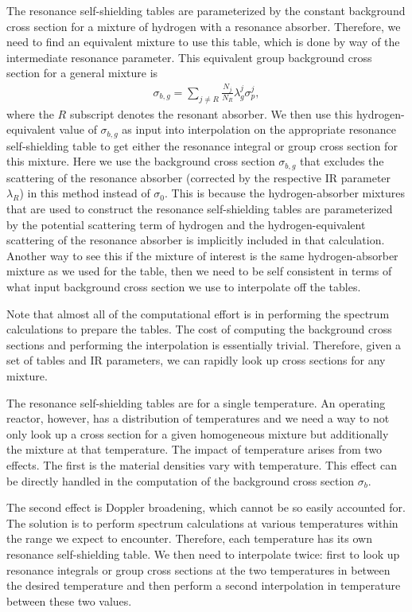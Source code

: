 The resonance self-shielding tables are parameterized by the constant background cross section for a mixture of hydrogen with a resonance absorber. Therefore, we need to find an equivalent mixture to use this table, which is done by way of the intermediate resonance parameter. This equivalent group background cross section for a general mixture is
\begin{align}
  \sigma_{b,g} = \sum_{j \ne R} \frac{N_j}{N_R} \lambda_g^j \sigma_p^j ,
\end{align}
where the $R$ subscript denotes the resonant absorber. We then use this hydrogen-equivalent value of $\sigma_{b,g}$ as input into interpolation on the appropriate resonance self-shielding table to get either the resonance integral or group cross section for this mixture. Here we use the background cross section $\sigma_{b,g}$ that excludes the scattering of the resonance absorber (corrected by the respective IR parameter $\lambda_R$) in this method instead of $\sigma_0$. This is because the hydrogen-absorber mixtures that are used to construct the resonance self-shielding tables are parameterized by the potential scattering term of hydrogen and the hydrogen-equivalent scattering of the resonance absorber is implicitly included in that calculation. Another way to see this if the mixture of interest is the same hydrogen-absorber mixture as we used for the table, then we need to be self consistent in terms of what input background cross section we use to interpolate off the tables.

Note that almost all of the computational effort is in performing the spectrum calculations to prepare the tables. The cost of computing the background cross sections and performing the interpolation is essentially trivial. Therefore, given a set of tables and IR parameters, we can rapidly look up cross sections for any mixture.

The resonance self-shielding tables are for a single temperature. An operating reactor, however, has a distribution of temperatures and we need a way to not only look up a cross section for a given homogeneous mixture but additionally the mixture at that temperature. The impact of temperature arises from two effects. The first is the material densities vary with temperature. This effect can be directly handled in the computation of the background cross section $\sigma_b$. 

The second effect is Doppler broadening, which cannot be so easily accounted for. The solution is to perform spectrum calculations at various temperatures within the range we expect to encounter. Therefore, each temperature has its own resonance self-shielding table. We then need to interpolate twice: first to look up resonance integrals or group cross sections at the two temperatures in between the desired temperature and then perform a second interpolation in temperature between these two values.

